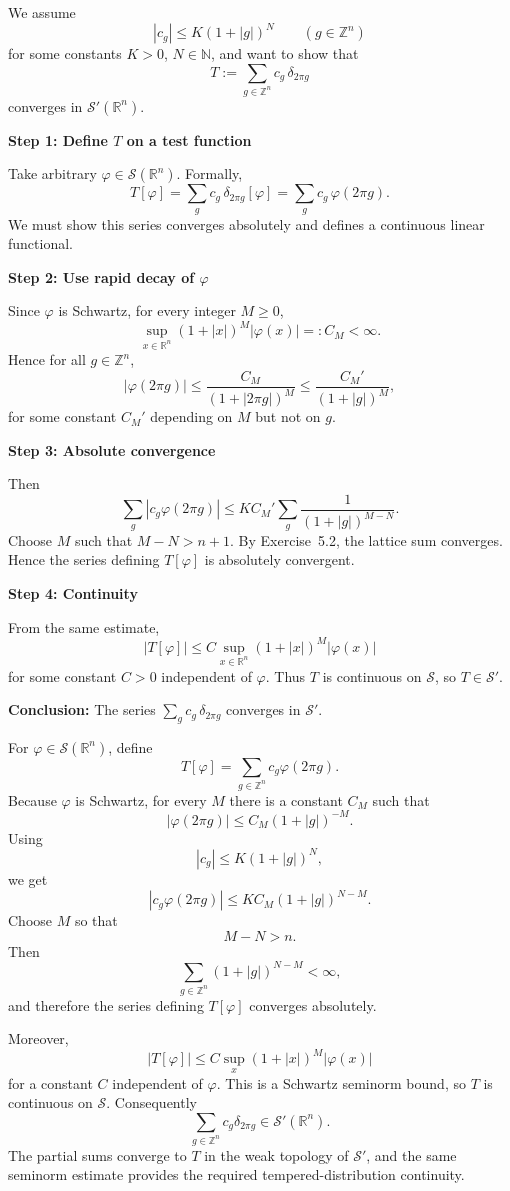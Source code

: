 \begin{problem}[CP-III-0002]
We assume
\[
|c_g| \le K(1+|g|)^N \qquad (g\in\mathbb{Z}^n)
\]
for some constants $K>0$, $N\in\mathbb{N}$, and want to show that
\[
T := \sum_{g\in\mathbb{Z}^n} c_g\,\delta_{2\pi g}
\]
converges in $\mathcal{S}'(\mathbb{R}^n)$.

\bigskip
\noindent\textbf{Step 1: Define $T$ on a test function}

Take arbitrary $\varphi\in\mathcal{S}(\mathbb{R}^n)$. Formally,
\[
T[\varphi]
= \sum_{g} c_g\,\delta_{2\pi g}[\varphi]
= \sum_{g} c_g\,\varphi(2\pi g).
\]
We must show this series converges absolutely and defines a continuous linear functional.

\bigskip
\noindent\textbf{Step 2: Use rapid decay of $\varphi$}

Since $\varphi$ is Schwartz, for every integer $M\ge 0$,
\[
\sup_{x\in\mathbb{R}^n} (1+|x|)^M |\varphi(x)| =: C_M < \infty.
\]
Hence for all $g\in\mathbb{Z}^n$,
\[
|\varphi(2\pi g)|
\le \frac{C_M}{(1+|2\pi g|)^M}
\le \frac{C_M'}{(1+|g|)^M},
\]
for some constant $C_M'$ depending on $M$ but not on $g$.

\bigskip
\noindent\textbf{Step 3: Absolute convergence}

Then
\[
\sum_{g} |c_g \varphi(2\pi g)|
\le K C_M' \sum_{g} \frac{1}{(1+|g|)^{M-N}}.
\]
Choose $M$ such that $M-N > n+1$.
By Exercise~5.2, the lattice sum converges.
Hence the series defining $T[\varphi]$ is absolutely convergent.

\bigskip
\noindent\textbf{Step 4: Continuity}

From the same estimate,
\[
|T[\varphi]|
\le C \sup_{x\in\mathbb{R}^n}(1+|x|)^M|\varphi(x)|
\]
for some constant $C>0$ independent of $\varphi$.
Thus $T$ is continuous on $\mathcal{S}$, so $T\in\mathcal{S}'$.

\bigskip
\noindent\textbf{Conclusion:}
The series $\displaystyle \sum_{g} c_g\,\delta_{2\pi g}$ converges in $\mathcal{S}'$.
\end{problem}

\begin{solution}
For \(\varphi\in\mathcal S(\mathbb R^n)\), define
\[
T[\varphi]
=
\sum_{g\in\mathbb Z^n}
c_g\varphi(2\pi g).
\]
Because \(\varphi\) is Schwartz, for every \(M\) there is a constant
\(C_M\) such that
\[
|\varphi(2\pi g)|
\le
C_M(1+|g|)^{-M}.
\]
Using
\[
|c_g|\le K(1+|g|)^N,
\]
we get
\[
|c_g\varphi(2\pi g)|
\le
KC_M(1+|g|)^{N-M}.
\]
Choose \(M\) so that
\[
M-N>n.
\]
Then
\[
\sum_{g\in\mathbb Z^n}(1+|g|)^{N-M}<\infty,
\]
and therefore the series defining \(T[\varphi]\) converges absolutely.

Moreover,
\[
|T[\varphi]|
\le
C
\sup_x (1+|x|)^M|\varphi(x)|
\]
for a constant \(C\) independent of \(\varphi\).  This is a Schwartz
seminorm bound, so \(T\) is continuous on \(\mathcal S\).  Consequently
\[
\boxed{
\sum_{g\in\mathbb Z^n}c_g\delta_{2\pi g}
\in\mathcal S'(\mathbb R^n).
}
\]
The partial sums converge to \(T\) in the weak topology of
\(\mathcal S'\), and the same seminorm estimate provides the required
tempered-distribution continuity.
\end{solution}


